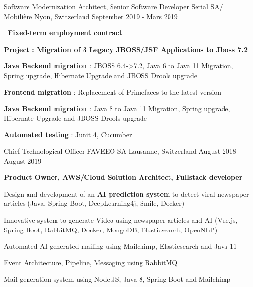 \begin{cventries}
        \cventry
        {Software Modernization Architect, Senior Software Developer} %
        {Serial SA/ Mobilière} %
        {Nyon, Switzerland} %
        {September 2019 - Mars 2019} %
        {
            \begin{cvitems} %
                \item{\textbf{\faFlagO\  Fixed-term employment contract}}
                \item{\textbf{Project : Migration of 3 Legacy JBOSS/JSF Applications to Jboss 7.2}}                
                \item{\textbf{Java Backend migration} : JBOSS 6.4->7.2, Java 6 to Java 11 Migration, Spring upgrade, Hibernate Upgrade and JBOSS Drools upgrade}
                \item{\textbf{Frontend migration} : Replacement of Primefaces to the latest version}
                \item{\textbf{Java Backend migration} : Java 8 to Java 11 Migration, Spring upgrade, Hibernate Upgrade and JBOSS Drools upgrade}
                \item \item{\textbf{Automated testing} : Junit 4, Cucumber}
            \end{cvitems}
        }

    \cventry
    {Chief Technological Officer} %
    {FAVEEO SA} %
    {Lausanne, Switzerland} %
    {August 2018 - August 2019} %
    {
        \begin{cvitems} %
            \item{\textbf{Product Owner, AWS/Cloud Solution Architect, Fullstack developer}}
            \item{Design and development of an \textbf{AI prediction system} to detect viral newspaper articles (Java, Spring Boot, DeepLearning4j, Smile, Docker)}
            \item{Innovative system to generate Video using newspaper articles and AI (Vue.js, Spring Boot, RabbitMQ; Docker, MongoDB, Elasticsearch, OpenNLP)}
            \item{Automated AI generated mailing using Mailchimp, Elasticsearch and Java 11}
            \item{Event Architecture, Pipeline, Messaging using RabbitMQ}
            \item{Mail generation system using Node.JS, Java 8, Spring Boot and Mailchimp}
        \end{cvitems}
    }


\end{cventries}
